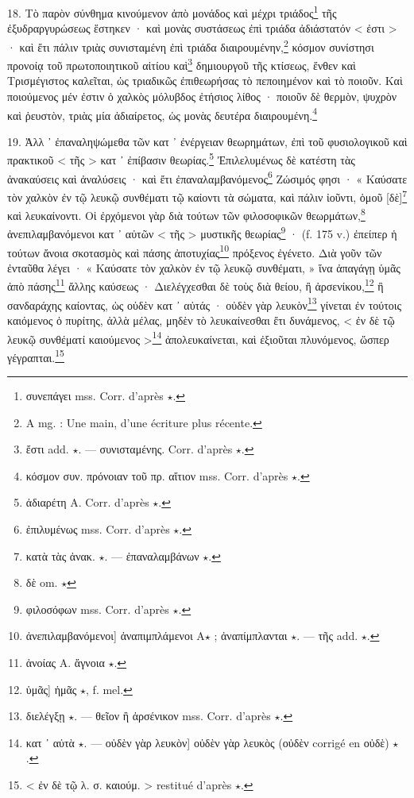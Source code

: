 \documentclass[a4paper, 11pt, oneside, polutonikogreek, french]{article}
\begin{document}
18. Τὸ παρὸν σύνθημα κινούμενον ἀπὸ μονάδος καὶ μέχρι τριάδος\footnote{συνεπάγει mss. Corr. d'après $\star$.} τῆς ἐξυδραργυρώσεως ἕστηκεν · καὶ μονὰς συστάσεως ἐπὶ τριάδα ἀδιάστατόν < ἐστι > · καὶ ἔτι πάλιν τριὰς συνισταμένη ἐπὶ τριάδα διαιρουμένην,\footnote{A mg. : Une main, d'une écriture plus récente.} κόσμον συνίστησι προνοίᾳ τοῦ πρωτοποιητικοῦ αἰτίου καὶ\footnote{ἔστι add. $\star$. --- συνισταμένης. Corr. d'après $\star$.} δημιουργοῦ τῆς κτίσεως, ἔνθεν καὶ Τρισμέγιστος καλεῖται, ὡς τριαδικῶς ἐπιθεωρήσας τὸ πεποιημένον καὶ τὸ ποιοῦν. Καὶ ποιούμενος μέν ἐστιν ὁ χαλκὸς μόλυβδος ἐτήσιος λίθος · ποιοῦν δὲ θερμὸν, ψυχρὸν καὶ ῥευστὸν, τριὰς μία ἀδιαίρετος, ὡς μονὰς δευτέρα διαιρουμένη.\footnote{κόσμον συν. πρόνοιαν τοῦ πρ. αἴτιον mss. Corr. d'après $\star$.}

19. Ἀλλ ᾽ ἐπαναληψώμεθα τῶν κατ ᾽ ἐνέργειαν θεωρημάτων, ἐπὶ τοῦ φυσιολογικοῦ καὶ πρακτικοῦ < τῆς > κατ ᾽ ἐπίβασιν θεωρίας.\footnote{ἀδιαρέτη A. Corr. d'après $\star$.} Ἐπιλελυμένως δὲ κατέστη τὰς ἀνακαύσεις καὶ ἀναλύσεις · καὶ ἔτι ἐπαναλαμβανόμενος\footnote{ἐπιλυμένως mss. Corr. d'après $\star$.} Ζώσιμός φησι · « Καύσατε τὸν χαλκὸν ἐν τῷ λευκῷ συνθέματι τῷ καίοντι τὰ σώματα, καὶ πάλιν ἰοῦντι, ὁμοῦ [δὲ]\footnote{κατὰ τὰς ἀνακ. $\star$. --- ἐπαναλαμβάνων $\star$.} καὶ λευκαίνοντι. Οἱ ἐρχόμενοι γὰρ διὰ τούτων τῶν φιλοσοφικῶν θεωρμάτων,\footnote{δὲ om. $\star$} ἀνεπιλαμβανόμενοι κατ ᾽ αὐτῶν < τῆς > μυστικῆς θεωρίας\footnote{φιλοσόφων mss. Corr. d'après $\star$.} · (f. 175 v.) ἐπείπερ ἡ τούτων ἄνοια σκοτασμὸς καὶ πάσης ἀποτυχίας\footnote{ἀνεπιλαμβανόμενοι] ἀναπιμπλάμενοι A$\star$ ; ἀναπίμπλανται $\star$. --- τῆς add. $\star$.} πρόξενος ἐγένετο. Διὰ γοῦν τῶν ἐνταῦθα λέγει · « Καύσατε τὸν χαλκὸν ἐν τῷ λευκῷ συνθέματι, » ἵνα ἀπαγάγῃ ὑμᾶς ἀπὸ πάσης\footnote{ἀνοίας A. ἄγνοια $\star$.} ἄλλης καύσεως · Διελέγχεσθαι δὲ τοὺς διὰ θείου, ἢ ἀρσενίκου,\footnote{ὑμᾶς] ἡμᾶς $\star$, f. mel.} ἢ σανδαράχης καίοντας, ὡς οὐδὲν κατ ᾽ αὐτάς · οὐδὲν γὰρ λευκὸν\footnote{διελέγξῃ $\star$. --- θεῖον ἢ ἀρσένικον mss. Corr. d'après $\star$.} γίνεται ἐν τούτοις καιόμενος ὁ πυρίτης, ἀλλὰ μέλας, μηδὲν τὸ λευκαίνεσθαι ἔτι δυνάμενος, < ἐν δὲ τῷ λευκῷ συνθέματί καιούμενος >\footnote{κατ ᾽ αὐτὰ $\star$. --- οὐδὲν γὰρ λευκὸν] οὐδὲν γὰρ λευκὸς (οὐδὲν corrigé en οὐδὲ) $\star$.} ἀπολευκαίνεται, καὶ ἐξιοῦται πλυνόμενος, ὥσπερ γέγραπται.\footnote{< ἐν δὲ τῷ λ. σ. καιούμ. > restitué d'après $\star$.}
\end{document}
